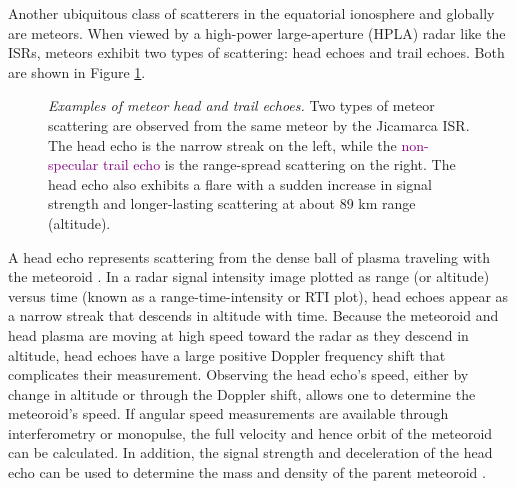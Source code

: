 Another ubiquitous class of scatterers in the equatorial ionosphere and globally are meteors. When viewed by a high-power large-aperture (HPLA) radar like the ISRs, meteors exhibit two types of scattering: head echoes and trail echoes. Both are shown in Figure \ref{fig:meteor_scattering_example}.
\begin{figure}[tbp]
 \centering
 \caption[Examples of meteor head and trail echoes]{\emph{Examples of meteor head and trail echoes.} Two types of meteor scattering are observed from the same meteor by the Jicamarca ISR. The \textcolor{green!80!black}{head echo} is the narrow streak on the left, while the \textcolor{purple}{non-specular trail echo} is the range-spread scattering on the right. The head echo also exhibits a \textcolor{yellow!80!black}{flare} with a sudden increase in signal strength and longer-lasting scattering at about 89 km range (altitude).}
 \label{fig:meteor_scattering_example}
\end{figure}%
A head echo represents scattering from the dense ball of plasma traveling with the meteoroid \autocite{CODD05}. In a radar signal intensity image plotted as range (or altitude) versus time (known as a range-time-intensity or RTI plot), head echoes appear as a narrow streak that descends in altitude with time. Because the meteoroid and head plasma are moving at high speed toward the radar as they descend in altitude, head echoes have a large positive Doppler frequency shift that complicates their measurement. Observing the head echo's speed, either by change in altitude or through the Doppler shift, allows one to determine the meteoroid's speed. If angular speed measurements are available through interferometry or monopulse, the full velocity and hence orbit of the meteoroid can be calculated. In addition, the signal strength and deceleration of the head echo can be used to determine the mass and density of the parent meteoroid \autocite{CVL+12}.


